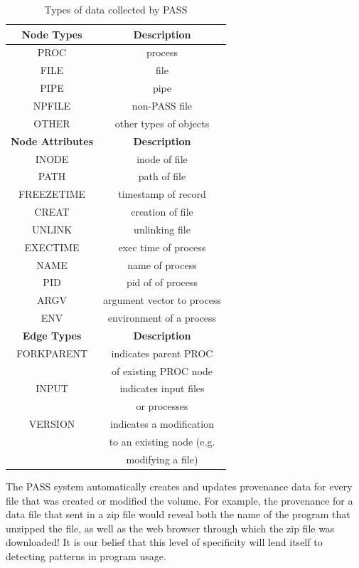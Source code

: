 \documentclass[10pt,twocolumn]{article}
\begin{document}
\begin{table}[H]
\begin{center}
\begin{tabular}{|c|c|}
\hline
{\bf Node Types} & {\bf Description} \\
\hline
PROC & process \\
FILE & file \\
PIPE & pipe \\
NPFILE & non-PASS file \\
OTHER & other types of objects \\
\hline
{\bf Node Attributes} & {\bf Description} \\
\hline
INODE & inode of file \\
PATH & path of file \\
FREEZETIME & timestamp of record \\
CREAT & creation of file \\
UNLINK & unlinking file \\
EXECTIME & exec time of process\\
NAME & name of process \\
PID & pid of of process \\
ARGV & argument vector to process \\
ENV & environment of a process \\
\hline
{\bf Edge Types} & {\bf Description} \\
\hline
FORKPARENT & indicates parent PROC\\
&  of existing PROC node \\
INPUT & indicates input files\\
& or processes \\
VERSION & indicates a modification  \\
& to an existing node (e.g. \\
& modifying a file) \\
\hline
\end{tabular}
\end{center}
\label{passobjects}
\caption{Types of data collected by PASS}
\end{table}%

The PASS system automatically creates and updates provenance data for every file that was created or modified the volume. For example, the provenance for a data file that sent in a zip file would reveal both the name of the program that unzipped the file, as well as the web browser through which the zip file was downloaded! It is our belief that this level of specificity will lend itself to detecting patterns in program usage.
\end{document}
